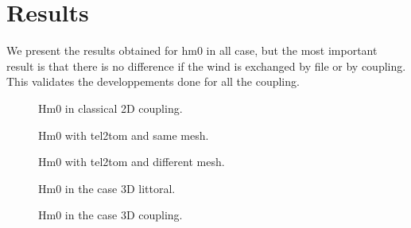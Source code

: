 \section{Results}
We present the results obtained for hm0 in all case, but the most important result
is that there is no difference if the wind is exchanged by file or by coupling.
This validates the developpements done for all the coupling.

\begin{figure} [!h]
\centering
{}
 \caption{Hm0 in classical 2D coupling.}
\label{hm0littoral2d}
\end{figure}

\begin{figure} [!h]
\centering
{}
 \caption{Hm0 with tel2tom and same mesh.}
\label{hm0same}
\end{figure}

\begin{figure} [!h]
\centering
{}
 \caption{Hm0 with tel2tom and different mesh.}
\label{hm0different}
\end{figure}

\begin{figure} [!h]
\centering
{}
 \caption{Hm0 in the case 3D littoral.}
\label{hm03dlittoral}
\end{figure}

\begin{figure} [!h]
\centering
{}
 \caption{Hm0 in the case 3D coupling.}
\label{hm03dcoupling}
\end{figure}

